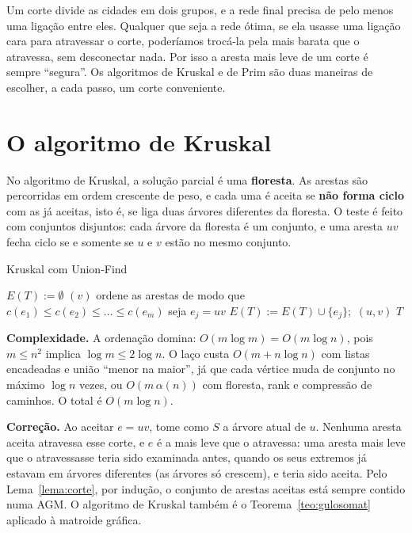 \begin{intuicao}
Um corte divide as cidades em dois grupos, e a rede final precisa de pelo menos uma ligação entre eles. Qualquer que seja a rede ótima, se ela usasse uma ligação cara para atravessar o corte, poderíamos trocá-la pela mais barata que o atravessa, sem desconectar nada. Por isso a aresta mais leve de um corte é sempre ``segura''. Os algoritmos de Kruskal e de Prim são duas maneiras de escolher, a cada passo, um corte conveniente.
\end{intuicao}

\section{O algoritmo de Kruskal}\label{sec:kruskal}
No algoritmo de Kruskal, a solução parcial é uma \textbf{floresta}. As arestas são percorridas em ordem crescente de peso, e cada uma é aceita se \textbf{não forma ciclo} com as já aceitas, isto é, se liga duas árvores diferentes da floresta. O teste é feito com conjuntos disjuntos: cada árvore da floresta é um conjunto, e uma aresta $uv$ fecha ciclo se e somente se $u$ e $v$ estão no mesmo conjunto.
\begin{pseudo}{Kruskal com Union-Find}
\begin{algorithmic}
  \State $E(T):=\emptyset$
   \State \MakeSet$(v)$  \EndFor
  \State ordene as arestas de modo que $c(e_1)\le c(e_2)\le\dots\le c(e_m)$ 
    \State seja $e_j=uv$
     
      \State $E(T):=E(T)\cup\{e_j\}$;\ \Union$(u,v)$
    \EndIf
  \EndFor
  \State \Return $T$ 
\EndFunction
\end{algorithmic}
\end{pseudo}
\textbf{Complexidade.} A ordenação domina: $O(m\log m)=O(m\log n)$, pois $m\le n^2$ implica $\log m\le2\log n$. O laço custa $O(m+n\log n)$ com listas encadeadas e união ``menor na maior'', já que cada vértice muda de conjunto no máximo $\log n$ vezes, ou $O(m\,\alpha(n))$ com floresta, rank e compressão de caminhos. O total é $O(m\log n)$.

\textbf{Correção.} Ao aceitar $e=uv$, tome como $S$ a árvore atual de $u$. Nenhuma aresta aceita atravessa esse corte, e $e$ é a mais leve que o atravessa: uma aresta mais leve que o atravessasse teria sido examinada antes, quando os seus extremos já estavam em árvores diferentes (as árvores só crescem), e teria sido aceita. Pelo Lema~\ref{lema:corte}, por indução, o conjunto de arestas aceitas está sempre contido numa AGM. O algoritmo de Kruskal também é o Teorema~\ref{teo:gulosomat} aplicado à matroide gráfica.


